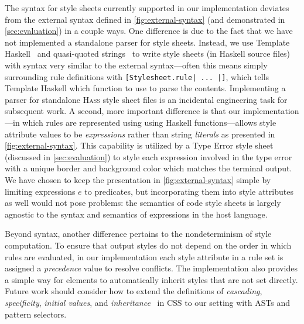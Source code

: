 \documentclass[acmsmall, screen]{acmart}
\newcommand{\hass}
{\textsc{Hass}}
\newcommand{\varExp}{e}
\begin{document}
The syntax for style sheets currently supported in our implementation deviates from the external syntax defined in \autoref{fig:external-syntax} (and demonstrated in \autoref{sec:evaluation}) in a couple ways. One difference is due to the fact that we have not implemented a standalone parser for style sheets.
Instead, we use Template Haskell~\cite{TemplateHaskell} and quasi-quoted strings~\cite{QuasiQuotes} to write style sheets (in Haskell source files) with syntax very similar to the external syntax---often this means simply surrounding rule definitions with \verb+[Stylesheet.rule| ... |]+, which tells Template Haskell which function to use to parse the contents.
Implementing a parser for standalone \hass{} style sheet files is an incidental engineering task for subsequent work.
A second, more important difference is that our implementation---in which rules are represented using using Haskell functions---allows style attribute values to be \emph{expressions} rather than string \emph{literals} as presented in \autoref{fig:external-syntax}.
This capability is utilized by a Type Error style sheet (discussed in \autoref{sec:evaluation}) to style each expression involved in the type error with a unique border and background color which matches the terminal output.
We have chosen to keep the presentation in \autoref{fig:external-syntax} simple by limiting expressions $\varExp$ to predicates, but incorporating them into style attributes as well would not pose problems: the semantics of code style sheets is largely agnostic to the syntax and semantics of expressions in the host language.



Beyond syntax,
another difference pertains to the nondeterminism of style computation.
To ensure that output styles do not depend on the order in which rules are evaluated, in our implementation each style attribute in a rule set is assigned a \emph{precedence} value to resolve conflicts.
The implementation also provides a simple way for elements to automatically inherit styles that are not set directly.
Future work should consider how to extend the definitions of \emph{cascading}, \emph{specificity}, \emph{initial values}, and \emph{inheritance}~\citep{mdnDocs} in CSS to our setting with ASTs and pattern selectors.
\end{document}
